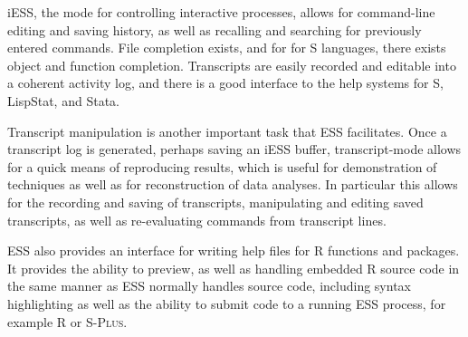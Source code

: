\documentclass{article}
\newcommand*{\Splus}{\textsc{S-Plus}}
\begin{document}
iESS, the mode for controlling interactive processes, allows for
command-line editing and saving history, as well as recalling and
searching for previously entered commands.  File completion exists,
and for for S languages, there exists object and function completion.
Transcripts are easily recorded and editable into a coherent activity
log, and there is a good interface to the help systems for S,
LispStat, and Stata.

Transcript manipulation is another important task that ESS
facilitates.  Once a transcript log is generated, perhaps saving an
iESS buffer, transcript-mode allows for a quick means of reproducing
results, which is useful for demonstration of techniques as well as
for reconstruction of data analyses.  In particular this allows for
the recording and saving of transcripts, manipulating and editing
saved transcripts, as well as re-evaluating commands from transcript
lines. 

ESS also provides an interface for writing help files for R functions
and packages.    It provides the ability to preview, as well as
handling embedded R source code in the same manner as ESS normally
handles source code, including syntax highlighting as well as the
ability to submit code to a running ESS process, for example R or
\Splus. 
\end{document}
